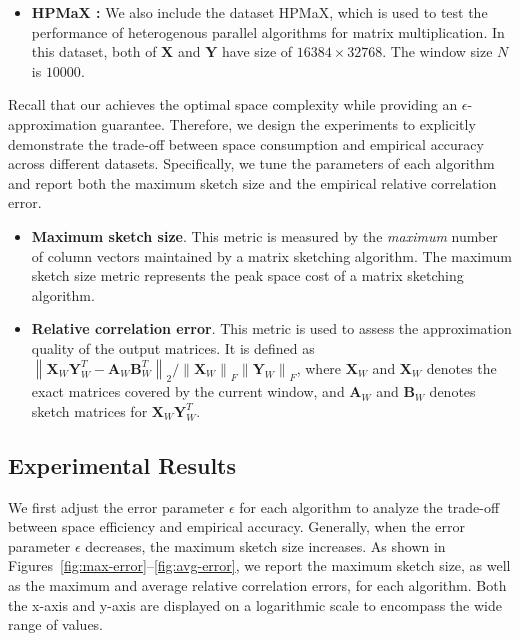 \begin{itemize}[leftmargin=10pt]
 \item \textbf{HPMaX \cite{KangKK20}:} We also include the dataset HPMaX, which is used to test the performance of heterogenous parallel algorithms for matrix multiplication. In this dataset, both of $\boldsymbol{X}$ and $\boldsymbol{Y}$  have size of $16384\times 32768$. The window size $N$ is $10000$.
\end{itemize}


 Recall that our \oursolution achieves the optimal space complexity while providing an $\epsilon$-approximation guarantee. Therefore, we design the experiments to explicitly demonstrate the trade-off between space consumption and empirical accuracy across different datasets. Specifically, we tune the parameters of each algorithm and report both the maximum sketch size and the empirical relative correlation error.  
\begin{itemize}[topsep=0.5mm, partopsep=0pt, itemsep=0pt, leftmargin=10pt] 
    \item \textbf{Maximum sketch size}. This metric is measured by the \textit{maximum} number of column vectors maintained by a matrix sketching algorithm. The maximum sketch size metric represents the peak space cost of a matrix sketching algorithm. 
    \item \textbf{Relative correlation error}. This metric is used to assess the approximation quality of the output matrices. It is defined as $\left\| \boldsymbol{X}_W \boldsymbol{Y}_W^T - \boldsymbol{A}_W \boldsymbol{B}_W^T\right\|_2 /\left\|\boldsymbol{X}_W\right\|_F\left\|\boldsymbol{Y}_W\right\|_F$, where $\boldsymbol{X}_W$ and $\boldsymbol{X}_W$ denotes the exact matrices covered by the current window, and $\boldsymbol{A}_W$ and $\boldsymbol{B}_W$ denotes sketch matrices for $\boldsymbol{X}_W\boldsymbol{Y}_W^T$. 
\end{itemize} 





\subsection{Experimental Results}
We first adjust the error parameter $\epsilon$ for each algorithm to analyze the trade-off between space efficiency and empirical accuracy. Generally, when the error parameter $\epsilon$ decreases, the maximum sketch size increases. As shown in Figures~\ref{fig:max-error}--\ref{fig:avg-error}, we report the maximum sketch size, as well as the maximum and average relative correlation errors, for each algorithm. Both the x-axis and y-axis are displayed on a logarithmic scale to encompass the wide range of values. 

